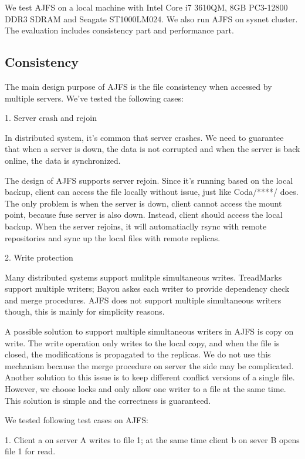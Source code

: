 We test AJFS on a local machine with Intel Core i7 3610QM, 8GB PC3-12800 DDR3 SDRAM and Seagate ST1000LM024. We also run AJFS on sysnet cluster. The evaluation includes consistency part and performance part.

\subsection{Consistency}

The main design purpose of AJFS is the file consistency when accessed by multiple servers. We've tested the following cases:

1. Server crash and rejoin

In distributed system, it's common that server crashes. We need to guarantee that when a server is down, the data is not corrupted and when the server is back online, the data is synchronized.

The design of AJFS supports server rejoin. Since it's running based on the local backup, client can access the file locally without issue, just like Coda/****/ does. The only problem is when the server is down, client cannot access the mount point, because fuse server is also down. Instead, client should access the local backup. When the server rejoins, it will automatiaclly rsync with remote repositories and sync up the local files with remote replicas.

2. Write protection

Many distributed systems support mulitple simultaneous writes. TreadMarks support multiple writers; Bayou askes each writer to provide dependency check and merge procedures. AJFS does not support multiple simultaneous writers though, this is mainly for simplicity reasons. 

A possible solution to support multiple simultaneous writers in AJFS is copy on write. The write operation only writes to the local copy, and when the file is closed, the modifications is propagated to the replicas. We do not use this mechanism because the merge procedure on server the side may be complicated. Another solution to this issue is to keep different conflict versions of a single file. 
However, we choose locks and only allow one writer to a file at the same time. This solution is simple and the correctness is guaranteed.

We tested following test cases on AJFS:

1. Client a on server A writes to file 1; at the same time client b on sever B opens file 1 for read.

